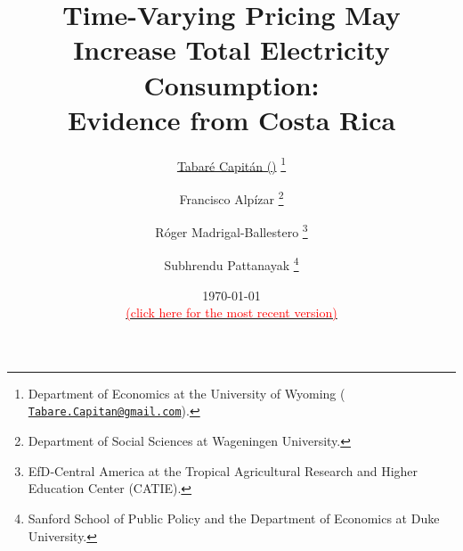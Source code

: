 \title{\vspace{-2cm}
      \normalsize{\textbf{Time-Varying Pricing May Increase Total Electricity Consumption: \\ Evidence from Costa Rica}}
      }

\author{

    \small{\href{www.TabareCapitan.com}{Tabaré Capitán (\Letter)}}
        \thanks{
           Department of Economics at the University of Wyoming (\href{mailto:Tabare.Capitan@gmail.com}{
           \texttt{Tabare.Capitan@gmail.com}}).
        }

  \and
    \small{Francisco Alpízar}
        \thanks{
          Department of Social Sciences at Wageningen University.
        }

  \and
    \small{Róger Madrigal-Ballestero}
        \thanks{
          EfD‐Central America at the Tropical Agricultural Research and Higher Education Center (CATIE).
        }

  \and
    \small{Subhrendu Pattanayak}
        \thanks{
          Sanford School of Public Policy and the Department of Economics at Duke University.
        }
}


\date{
  \vspace{0.2cm}
  \footnotesize{\today}
  \\
  \href{https://www.tabarecapitan.com}
  {\footnotesize{\textcolor{red}{(click here for the most recent version)}}}
}

\maketitle

\thispagestyle{empty}   %

